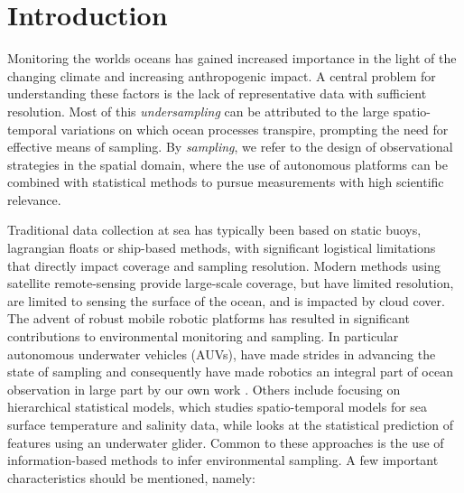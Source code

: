 \documentclass[aoas]{imsart}
\begin{document}
\section{Introduction}

Monitoring the worlds oceans has gained increased importance in the
light of the changing climate and increasing anthropogenic impact. A
central problem for understanding these factors is the lack of
representative data with sufficient resolution. Most of this
\emph{undersampling} can be attributed to the large spatio-temporal
variations on which ocean processes transpire, prompting the need for
effective means of sampling. By \emph{sampling}, we refer to the design
of observational strategies in the spatial domain, where the use of
autonomous platforms can be combined with statistical methods to pursue
measurements with high scientific relevance.

Traditional data collection at sea has typically been based on static
buoys, lagrangian floats or ship-based methods, with significant
logistical limitations that directly impact coverage and sampling
resolution. Modern methods using satellite remote-sensing provide
large-scale coverage, but have limited resolution, are limited to
sensing the surface of the ocean, and is impacted by cloud cover. The
advent of robust mobile robotic platforms \cite{Bellingham07} has
resulted in significant contributions to environmental monitoring and
sampling. In particular autonomous underwater vehicles (AUVs), have made
strides in advancing the state of sampling and consequently have made
robotics an integral part of ocean observation in large part by our own
work %
\citep{das11b,Graham2013,Das2015,das15,fossuminformation,fossum18b}.
Others include \cite{wikle2013modern} focusing on hierarchical
statistical models, \cite{sahu2008space} which studies spatio-temporal
models for sea surface temperature and salinity data, while
\cite{mellucci2018oceanic} looks at the statistical prediction of
features using an underwater glider. Common to these approaches is the
use of information-based methods to infer environmental sampling. A few
important characteristics should be mentioned, namely:
\end{document}
